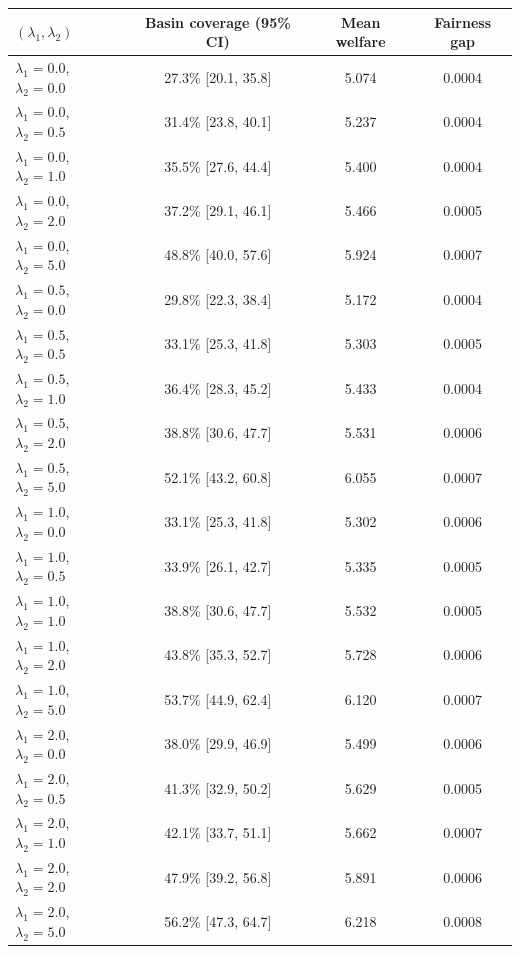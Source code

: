 \begin{table}[h]\centering
\begin{tabular}{lccc}\toprule
  $(\lambda_1, \lambda_2)$ & Basin coverage (95\% CI) & Mean welfare & Fairness gap \\
\midrule
  $\lambda_1=0.0$, $\lambda_2=0.0$ & 27.3\% [20.1, 35.8] & 5.074 & 0.0004 \\
  $\lambda_1=0.0$, $\lambda_2=0.5$ & 31.4\% [23.8, 40.1] & 5.237 & 0.0004 \\
  $\lambda_1=0.0$, $\lambda_2=1.0$ & 35.5\% [27.6, 44.4] & 5.400 & 0.0004 \\
  $\lambda_1=0.0$, $\lambda_2=2.0$ & 37.2\% [29.1, 46.1] & 5.466 & 0.0005 \\
  $\lambda_1=0.0$, $\lambda_2=5.0$ & 48.8\% [40.0, 57.6] & 5.924 & 0.0007 \\
  $\lambda_1=0.5$, $\lambda_2=0.0$ & 29.8\% [22.3, 38.4] & 5.172 & 0.0004 \\
  $\lambda_1=0.5$, $\lambda_2=0.5$ & 33.1\% [25.3, 41.8] & 5.303 & 0.0005 \\
  $\lambda_1=0.5$, $\lambda_2=1.0$ & 36.4\% [28.3, 45.2] & 5.433 & 0.0004 \\
  $\lambda_1=0.5$, $\lambda_2=2.0$ & 38.8\% [30.6, 47.7] & 5.531 & 0.0006 \\
  $\lambda_1=0.5$, $\lambda_2=5.0$ & 52.1\% [43.2, 60.8] & 6.055 & 0.0007 \\
  $\lambda_1=1.0$, $\lambda_2=0.0$ & 33.1\% [25.3, 41.8] & 5.302 & 0.0006 \\
  $\lambda_1=1.0$, $\lambda_2=0.5$ & 33.9\% [26.1, 42.7] & 5.335 & 0.0005 \\
  $\lambda_1=1.0$, $\lambda_2=1.0$ & 38.8\% [30.6, 47.7] & 5.532 & 0.0005 \\
  $\lambda_1=1.0$, $\lambda_2=2.0$ & 43.8\% [35.3, 52.7] & 5.728 & 0.0006 \\
  $\lambda_1=1.0$, $\lambda_2=5.0$ & 53.7\% [44.9, 62.4] & 6.120 & 0.0007 \\
  $\lambda_1=2.0$, $\lambda_2=0.0$ & 38.0\% [29.9, 46.9] & 5.499 & 0.0006 \\
  $\lambda_1=2.0$, $\lambda_2=0.5$ & 41.3\% [32.9, 50.2] & 5.629 & 0.0005 \\
  $\lambda_1=2.0$, $\lambda_2=1.0$ & 42.1\% [33.7, 51.1] & 5.662 & 0.0007 \\
  $\lambda_1=2.0$, $\lambda_2=2.0$ & 47.9\% [39.2, 56.8] & 5.891 & 0.0006 \\
  $\lambda_1=2.0$, $\lambda_2=5.0$ & 56.2\% [47.3, 64.7] & 6.218 & 0.0008 \\

\end{tabular}
\end{table}
